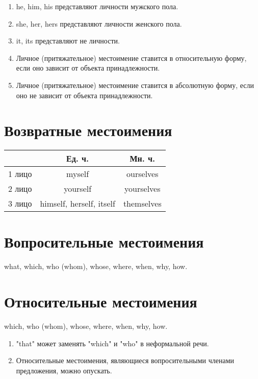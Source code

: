 \documentclass[oneside]{book}
\begin{document}
	\begin{enumerate}
		\item he, him, his представляют личности мужского пола.

		\item she, her, hers представляют личности женского пола.

		\item it, its представляют не личности.

		\item Личное (притяжательное) местоимение
		ставится в относительную форму,
		если оно зависит от объекта
		принадлежности.

		\item Личное (притяжательное) местоимение
		ставится в абсолютную форму,
		если оно не зависит от объекта
		принадлежности.
	\end{enumerate}

	\section{Возвратные местоимения}
	\begin{center}
		\begin{tabular}{|c|c|c|}
			\hline

			& Ед. ч. & Мн. ч.
			\\
			\hline

			1 лицо & myself & ourselves
			\\
			\hline

			2 лицо & yourself & yourselves
			\\
			\hline

			3 лицо & himself, herself, itself & themselves
			\\
			\hline
		\end{tabular}
	\end{center}

	\section{Вопросительные местоимения}
	what, which, who (whom), whose,
	where, when, why, how.

	\section{Относительные местоимения}
	which, who (whom), whose,
	where, when, why, how.

	\begin{enumerate}
		\item "that" может заменять "which" и "who"
		в неформальной речи.

		\item Относительные местоимения,
		являющиеся вопросительными членами
		предложения, можно опускать.
	\end{enumerate}
\end{document}
